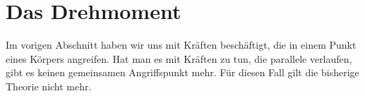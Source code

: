 
\section*{Das Drehmoment}
Im vorigen Abschnitt haben wir uns mit Kräften beschäftigt, die in einem Punkt eines Körpers angreifen.
Hat man es mit Kräften zu tun, die parallele verlaufen, gibt es keinen gemeinsamen Angriffspunkt mehr. 
Für diesen Fall gilt die bisherige Theorie nicht mehr.



\newpage
{}

